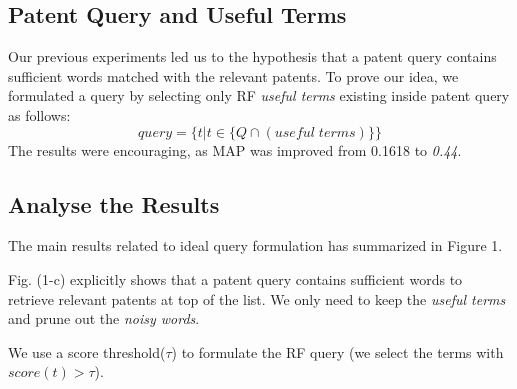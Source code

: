\documentclass{sig-alternate}
\begin{document}
\subsection{Patent Query and Useful Terms}
Our previous experiments led us to the hypothesis that a patent query contains sufficient words matched with the relevant patents.
To prove our idea, we formulated a query by selecting only RF {\em useful terms} existing inside patent query as follows: 
\begin{equation}
 query = \{t|t \in \{ Q\cap (useful \; terms)\}\}   
 \label{eq:score}
\end{equation}
The results were encouraging, as MAP was improved from 0.1618 to {\em 0.44}.
\subsection{Analyse the Results}
The main results related to ideal query formulation has summarized in Figure 1. 

Fig. (1-c) explicitly shows that a patent query contains sufficient words to retrieve relevant patents at top of the list. We only need to keep the {\em useful terms} and prune out the {\em noisy words}.

We use a score threshold($\tau$) to formulate the RF query (we select the terms with $ score(t)>\tau $). 
\end{document}
